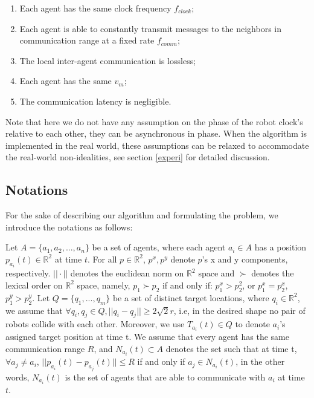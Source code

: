 \documentclass[journal]{IEEEtran}
\begin{document}
\begin{enumerate}[label=(\alph*), leftmargin=*]
    
     \item Each agent has the same clock frequency $f_{clock}$;
     \item Each agent is able to constantly transmit messages to the neighbors in communication range at a fixed rate $f_{comm}$;
     \item The local inter-agent communication is lossless;
   
    \item Each agent has the same $v_m$;
     \item The communication latency is negligible. 
\end{enumerate}

\noindent Note that here we do not have any assumption on the phase of the robot clock's relative to each other, they can be asynchronous in phase. When the algorithm is implemented in the real world, these assumptions can be relaxed to accommodate the real-world non-idealities, see section \ref{experi} for detailed discussion. 

\label{assumptions}


\subsection{Notations}
For the sake of describing our algorithm and formulating the problem, we introduce the notations as follows:

Let $A = \{a_1, a_2, ..., a_n\}$ be a set of agents, where each agent $a_i \in A$ has a position $p_{a_i}(t)\in {\mathbb{R}}^2$ at time $t$. For all $p\in \mathbb{R}^2$, $p^x, p^y$ denote $p$'s x and y components, respectively. $||\cdot||$ denotes the euclidean norm on ${\mathbb{R}}^2$ space and $\succ$ denotes the lexical order on $\mathbb{R}^2$ space, namely, $p_1\succ p_2$ if and only if: $p_1^x > p_2^2$, or $p_1^x=p_2^x$, $p_1^y>p_2^y$. Let $Q = \{q_1,..., q_m\}$ be a set of distinct target locations, where $q_i\in {\mathbb{R}}^2$, we assume that $\forall q_i, q_j \in Q, ||q_i - q_j|| \geq 2\sqrt{2}r$, i.e, in the desired shape no pair of robots collide with each other. Moreover, we use $T_{a_i}(t) \in Q$ to denote $a_i$'s assigned target position at time t. We assume that every agent has the same communication range $R$, and $N_{a_i}(t) \subset A$ denotes the set such that at time t, $\forall a_j \neq a_i$, $||p_{a_i}(t) - p_{a_j}(t)|| \leq R$ if and only if $a_j \in N_{a_i}(t)$, in the other words, $N_{a_i}(t)$ is the set of agents that are able to communicate with $a_i$ at time $t$.  
\end{document}
